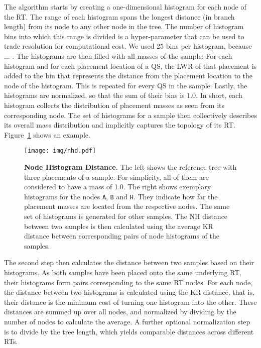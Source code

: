 The algorithm starts by creating a one-dimensional histogram for each node of the \ac{RT}.
The range of each histogram spans the longest distance (in branch length) from its node to any other node in the tree.
The number of histogram bins into which this range is divided is a hyper-parameter
that can be used to trade resolution for computational cost.
We used 25 bins per histogram, because ...
.
The histograms are then filled with all masses of the sample:
For each histogram and for each placement location of a \ac{QS}, the \ac{LWR} of that placement is added to the bin
that represents the distance from the placement location to the node of the histogram.
This is repeated for every \ac{QS} in the sample.
Lastly, the histograms are normalized, so that the sum of their bins is $1.0$.
In short, each histogram collects the distribution of placement masses as seen from its corresponding node.
The set of histograms for a sample then collectively describes its overall mass distribution
and implicitly captures the topology of its \ac{RT}.
Figure~\ref{fig:nhd} shows an example.

\begin{figure}[hpbt]
    \centering
    \texttt{[image: img/nhd.pdf]}
    \caption{
        \textbf{Node Histogram Distance.}
        The left shows the reference tree with three placements of a sample.
        For simplicity, all of them are considered to have a mass of 1.0.
        The right shows exemplary histograms for the nodes \texttt{A}, \texttt{B} and \texttt{H}.
        They indicate how far the placement masses are located from the respective nodes.
        The same set of histograms is generated for other samples.
        The NH distance between two samples is then calculated
        using the average KR distance between corresponding pairs of node histograms of the samples.
    }
    \label{fig:nhd}
\end{figure}

The second step then calculates the distance between two samples based on their histograms.
As both samples have been placed onto the same underlying \ac{RT}, their histograms form pairs corresponding to
the same \ac{RT} nodes.
For each node, the distance between two histograms is calculated using the KR distance,
that is, their distance is the minimum cost of turning one histogram into the other.
These distances are summed up over all nodes, and normalized by dividing by the number of nodes to calculate the average.
A further optional normalization step is to divide by the tree length,
which yields comparable distances across different \acp{RT}.

